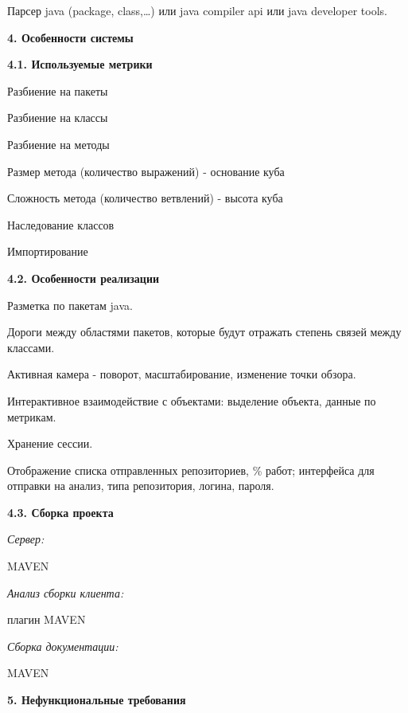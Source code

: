 \documentclass[a4paper,12pt]{article}
\begin{document}
		Парсер java (package, class,…) или java compiler api или java developer tools.
		
\maketitle
\newpage
\textbf{4. Особенности системы}
\newline

	\textbf{4.1.	Используемые метрики}
	\newline
	
	Разбиение на пакеты
	
	Разбиение на классы
	
	Разбиение на методы
	
	Размер метода (количество выражений) - основание куба
	
	Сложность метода (количество ветвлений) - высота куба
	
	Наследование классов
	
	Импортирование
	\newline
	
	\textbf{4.2.	Особенности реализации}
	\newline
	
		Разметка по пакетам java.
		
		Дороги между областями пакетов, которые будут отражать степень связей между классами.
		
		Активная камера - поворот, масштабирование, изменение точки обзора.
		
		Интерактивное взаимодействие с объектами: выделение объекта, данные по метрикам.

		Хранение сессии.

		Отображение списка отправленных репозиториев, \% работ; интерфейса для отправки на анализ, типа репозитория, логина, пароля.
		\newline
		
	\textbf{4.3.	Сборка проекта}
	\newline
	
	\textit{Сервер:}
	
	MAVEN
	\newline
	
	\textit{Анализ сборки клиента:}
	
	плагин MAVEN
	\newline
	
	\textit{Сборка документации:}
	
	MAVEN

\maketitle
\newpage
\textbf{5. Нефункциональные требования}
\newline
\end{document}
